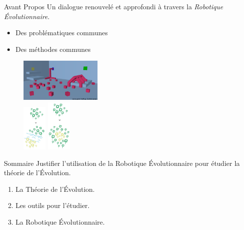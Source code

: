 \documentclass[8pt, handout=show,notes=show]{beamer}
\begin{document}
\begin{frame}{Avant Propos}
	Un dialogue renouvelé et approfondi à travers la \emph{Robotique \'Evolutionnaire}.
	\begin{itemize}
		\item Des problématiques communes
		\item Des méthodes communes
	\end{itemize}
	\begin{figure}[hbp]
		\begin{center}
			\includegraphics[width=4cm]{images/symbrion-gc1b.png} \\
			\includegraphics[width=1.2cm]{images/SpeciationAl.jpg}
			\hspace{1cm} \includegraphics[width=1.2cm]{images/SpeciationSy.jpg}
		\end{center}
	\end{figure}
\end{frame}

\begin{frame}{Sommaire}
		Justifier l'utilisation de la Robotique \'Evolutionnaire pour étudier la théorie de l'\'Evolution.
		\vfill
	\begin{enumerate}
		\item La Théorie de l'\'Evolution.
		\item Les outils pour l'étudier.
		\item La Robotique \'Evolutionnaire.
	\end{enumerate}
\end{frame}

\end{document}
